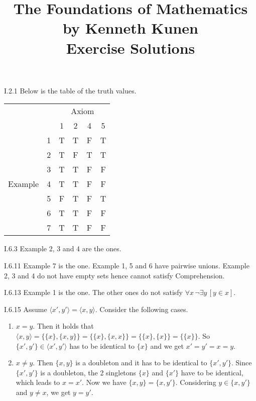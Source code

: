 \documentclass[12pt]{article}
\title{
  \vspace{-2cm}
  The Foundations of Mathematics \\
  \large by Kenneth Kunen \\
  Exercise Solutions
}
\begin{document}
\maketitle

\begin{customthm}{I.2.1}
  Below is the table of the truth values.
  \begin{center}
    \begin{tabular}{cc|cccc}
      & & \multicolumn{4}{c}{Axiom} \\
      & & 1 & 2 & 4 & 5 \\ \hline
      \multirow{7}{*}{Example}
      & 1 & T & T & F & T \\
      & 2 & T & F & T & T \\
      & 3 & T & T & F & F \\
      & 4 & T & T & F & F \\
      & 5 & F & T & F & T \\
      & 6 & T & T & F & F \\
      & 7 & T & T & F & F \\
    \end{tabular}
  \end{center}
\end{customthm}

\begin{customthm}{I.6.3}
  Example 2, 3 and 4 are the ones.
\end{customthm}

\begin{customthm}{I.6.11}
  Example 7 is the one. Example 1, 5 and 6 have pairwise unions. Example 2, 3 and 4 do not have empty sets hence cannot satisfy Comprehension.
\end{customthm}

\begin{customthm}{I.6.13}
  Example 1 is the one. The other ones do not satisfy $\forall x\,\neg\exists y\,[y\in x]$.
\end{customthm}

\begin{customthm}{I.6.15}
  Assume $\langle x',y'\rangle = \langle x,y\rangle$. Consider the following cases.
  \begin{enumerate}
    \item\underline{$x=y$}. Then it holds that $\langle x,y\rangle = \{\{x\}, \{x,y\}\} = \{\{x\}, \{x,x\}\} = \{\{x\}, \{x\}\} = \{\{x\}\}$. So $\{x',y'\}\in\langle x',y'\rangle$ has to be  identical to $\{x\}$ and we get $x'=y'=x=y$.
    \item\underline{$x\neq y$}. Then $\{x,y\}$ is a doubleton and it has to be identical to $\{x',y'\}$. Since $\{x',y'\}$ is a doubleton, the 2 singletons $\{x\}$ and $\{x'\}$ have to be identical, which leads to $x=x'$. Now we have $\{x,y\} = \{x,y'\}$. Considering $y\in \{x,y'\}$ and $y\neq x$, we get $y=y'$.
  \end{enumerate}
\end{customthm}
\end{document}
